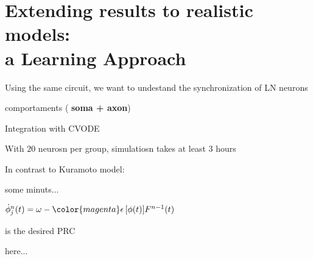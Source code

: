 \section{Extending results to realistic models: \\ a Learning Approach}

 Using the same circuit, we want to undestand the
synchronization of LN neurons

\usualsep
\begin{minipage}{0.2\textwidth}
  
  
   comportaments ({\bf \color{Green} soma + axon})
  
  \usualsep
   Integration with CVODE
  
\end{minipage}
\begin{minipage}{0.25\textwidth}
  
  \begin{center}
    
     With {\color{red} $20$ neurosn per group}, simulatiosn
    takes at least {\color{Orange} $3$ hours}
    
    \usualsep
     In contrast to Kuramoto model:
    
    {\color{blue} some minuts...}
    
  \end{center}
\end{minipage}

\usualsep\usualsep
\begin{minipage}{0.2\textwidth}
  
   
\end{minipage}
\begin{minipage}{0.25\textwidth}
  
  \begin{center}
    
    {\color{blue} $\dot{\phi}_j^n(t) = \omega - {\color{magenta}
        \epsilon \left[ \phi(t) \right]} F^{n-1}(t)$}
    
    \usualsep
     is the desired PRC
    
  \end{center}
\end{minipage}

\usualsep\usualsep\usualsep\usualsep\usualsep\usualsep\usualsep\usualsep\usualsep
here...
